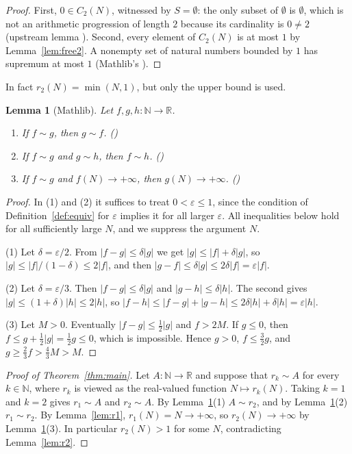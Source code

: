 \documentclass[11pt]{amsart}
\theoremstyle{plain}
\newtheorem{lemma}[theorem]{Lemma}
\theoremstyle{definition}
\newcommand{\N}{\mathbb{N}}
\newcommand{\R}{\mathbb{R}}
\begin{document}
\begin{proof}
First, $0\in C_2(N)$, witnessed by $S=\emptyset$: the only subset of $\emptyset$ is $\emptyset$, which is not an arithmetic progression of length $2$ because its cardinality is $0\ne 2$ (upstream lemma ). Second, every element of $C_2(N)$ is at most $1$ by Lemma~\ref{lem:free2}. A nonempty set of natural numbers bounded by $1$ has supremum at most $1$ (Mathlib's ).
\end{proof}

In fact $r_2(N)=\min(N,1)$, but only the upper bound is used.

\begin{lemma}[Mathlib]\label{lem:equiv}
Let $f,g,h\colon\N\to\R$.
\begin{enumerate}
\item If $f\sim g$, then $g\sim f$. \hfill\textup{()}
\item If $f\sim g$ and $g\sim h$, then $f\sim h$. \hfill\textup{()}
\item If $f\sim g$ and $f(N)\to+\infty$, then $g(N)\to+\infty$. \hfill\textup{()}
\end{enumerate}
\end{lemma}

\begin{proof}
In (1) and (2) it suffices to treat $0<\varepsilon\le 1$, since the condition of Definition~\ref{def:equiv} for $\varepsilon$ implies it for all larger $\varepsilon$. All inequalities below hold for all sufficiently large $N$, and we suppress the argument $N$.

(1) Let $\delta=\varepsilon/2$. From $|f-g|\le\delta|g|$ we get $|g|\le|f|+\delta|g|$, so $|g|\le|f|/(1-\delta)\le 2|f|$, and then $|g-f|\le\delta|g|\le 2\delta|f|=\varepsilon|f|$.

(2) Let $\delta=\varepsilon/3$. Then $|f-g|\le\delta|g|$ and $|g-h|\le\delta|h|$. The second gives $|g|\le(1+\delta)|h|\le 2|h|$, so $|f-h|\le|f-g|+|g-h|\le 2\delta|h|+\delta|h|=\varepsilon|h|$.

(3) Let $M>0$. Eventually $|f-g|\le\frac12|g|$ and $f>2M$. If $g\le 0$, then $f\le g+\frac12|g|=\frac12 g\le 0$, which is impossible. Hence $g>0$, $f\le\frac32 g$, and $g\ge\frac23 f>\frac43 M>M$.
\end{proof}

\begin{proof}[Proof of Theorem~\ref{thm:main}]
Let $A\colon\N\to\R$ and suppose that $r_k\sim A$ for every $k\in\N$, where $r_k$ is viewed as the real-valued function $N\mapsto r_k(N)$. Taking $k=1$ and $k=2$ gives $r_1\sim A$ and $r_2\sim A$. By Lemma~\ref{lem:equiv}(1) $A\sim r_2$, and by Lemma~\ref{lem:equiv}(2) $r_1\sim r_2$. By Lemma~\ref{lem:r1}, $r_1(N)=N\to+\infty$, so $r_2(N)\to+\infty$ by Lemma~\ref{lem:equiv}(3). In particular $r_2(N)>1$ for some $N$, contradicting Lemma~\ref{lem:r2}.
\end{proof}
\end{document}
